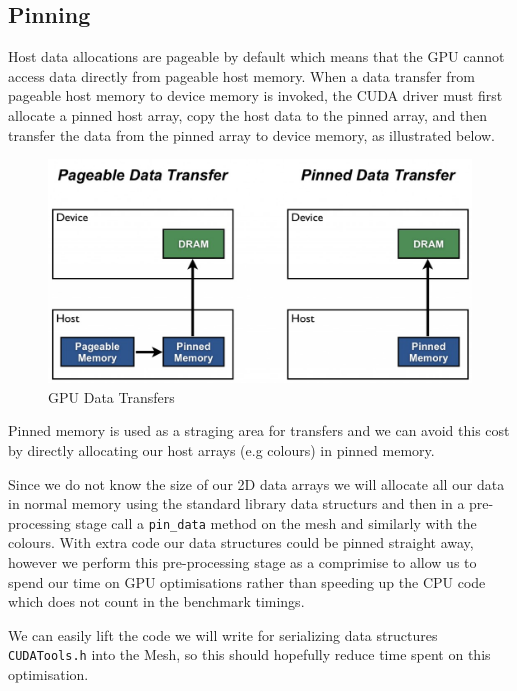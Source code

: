 \subsection*{Pinning}
Host data allocations are pageable by default which means that the GPU cannot access data directly from pageable host memory. When a data transfer from pageable host memory to device memory is invoked, the CUDA driver must first allocate a pinned host array, copy the host data to the pinned array, and then transfer the data from the pinned array to device memory\cite{transfer}, as illustrated below.
\begin{figure}[H]\centering
\includegraphics[scale=0.5]{images/pinning}
\caption[pinning]{GPU Data Transfers\cite{transfer}}
\end{figure}
Pinned memory is used as a straging area for transfers and we can avoid this cost by directly allocating our host arrays (e.g colours) in pinned memory.

Since we do not know the size of our 2D data arrays we will allocate all our data in normal memory using the standard library data structurs and then in a pre-processing stage call a \verb!pin_data! method on the mesh and similarly with the colours.
With extra code our data structures could be pinned straight away, however we perform this pre-processing stage as a comprimise to allow us to spend our time on GPU optimisations rather than speeding up the CPU code which does not count in the benchmark timings.

We can easily lift the code we will write for serializing data structures \verb!CUDATools.h! into the Mesh, so this should hopefully reduce time spent on this optimisation.